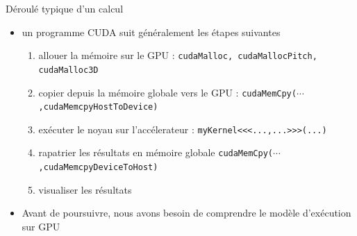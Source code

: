 \documentclass[11pt,mathserif]{beamer}
\begin{document}
\begin{frame}{Déroulé typique d'un calcul}
\pause
  \begin{itemize}[<+->]
  \item un programme CUDA suit généralement les étapes suivantes 
\begin{enumerate}[<+->]
 \item allouer la mémoire sur le GPU : \texttt{cudaMalloc, cudaMallocPitch, cudaMalloc3D}
 \item copier depuis la mémoire globale vers le GPU : \texttt{cudaMemCpy($\cdots$,cudaMemcpyHostToDevice)}
 \item exécuter le noyau sur l'accélerateur : \texttt{myKernel<<<...,...>>>(...)}
 \item rapatrier les résultats en mémoire globale \texttt{cudaMemCpy($\cdots$,cudaMemcpyDeviceToHost)}
 \item visualiser les résultats
\end{enumerate}
\item Avant de poursuivre, nous avons besoin de comprendre le modèle d'exécution sur GPU
\end{itemize}
\end{frame}
\end{document}
